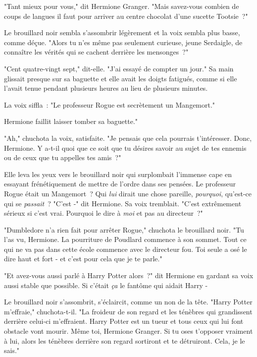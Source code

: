 "Tant mieux pour vous," dit Hermione Granger. "Mais savez-vous combien de coups de langues il faut pour arriver au centre chocolat d'une sucette Tootsie~?"

Le brouillard noir sembla s'assombrir légèrement et la voix sembla plus basse, comme déçue. "Alors tu n'es même pas seulement curieuse, jeune Serdaigle, de connaître les vérités qui se cachent derrière les mensonges~?"

"Cent quatre-vingt sept," dit-elle. "J'ai essayé de compter un jour." Sa main glissait presque sur sa baguette et elle avait les doigts fatigués, comme si elle l'avait tenue pendant plusieurs heures au lieu de plusieurs minutes.

La voix siffla~: "Le professeur Rogue est secrètement un Mangemort."

Hermione faillit laisser tomber sa baguette."

"Ah," chuchota la voix, satisfaite. "Je pensais que cela pourrais t'intéresser. Donc, Hermione. Y a-t-il quoi que ce soit que tu désires savoir au sujet de tes ennemis ou de ceux que tu appelles tes amis~?"

Elle leva les yeux vers le brouillard noir qui surplombait l'immense cape en essayant frénétiquement de mettre de l'ordre dans ses pensées. Le professeur Rogue était un Mangemort~? Qui \emph{lui} dirait une chose pareille, \emph{pourquoi}, qu'est-ce qui se \emph{passait}~? "C'est -" dit Hermione. Sa voix tremblait. "C'est extrêmement sérieux si c'est vrai. Pourquoi le dire à \emph{moi} et pas au directeur~?"

"Dumbledore n'a rien fait pour arrêter Rogue," chuchota le brouillard noir. "Tu l'as vu, Hermione. La pourriture de Poudlard commence à son sommet. Tout ce qui ne va pas dans cette école commence avec le directeur fou. Toi seule a osé le dire haut et fort - et c'est pour cela que je te parle."

"Et avez-vous aussi parlé à Harry Potter alors~?" dit Hermione en gardant sa voix aussi stable que possible. Si c'était \emph{ça} le fantôme qui aidait Harry -

Le brouillard noir s'assombrit, s'éclaircit, comme un non de la tête. "Harry Potter m'effraie," chuchota-t-il. "La froideur de son regard et les ténèbres qui grandissent derrière celui-ci m'effraient. Harry Potter est un tueur et tous ceux qui lui font obstacle vont mourir. Même toi, Hermione Granger. Si tu oses t'opposer vraiment à lui, alors les ténèbres derrière son regard sortiront et te détruiront. Cela, je le sais."

